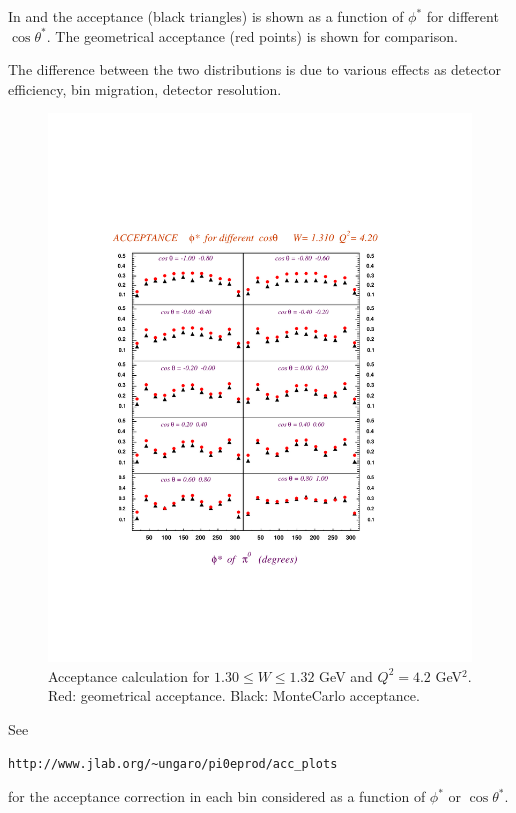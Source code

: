 In  and  the acceptance (black triangles)
is shown as a function of $\phi^*$ for different $\cos\theta^*$. 
The geometrical acceptance (red points)
is shown for comparison.

The difference between the two distributions is due to various effects
as detector efficiency, bin migration, detector resolution.




\begin{figure}[h]
 \begin{center}
  \includegraphics[width=15cm, bb=0 120 540 640]{acceptance/img/acc_phi_W1.31_Q24.20}
  \caption[Comparison Geometrical and MonteCarlo acceptances, $1.30\le W\le 1.32$ GeV and $Q^2=4.2$ GeV$^2$]
          { Acceptance calculation for $1.30\le W\le 1.32$ GeV and $Q^2=4.2$ GeV$^2$. Red: geometrical 
	             acceptance. Black: MonteCarlo acceptance.}
 \label{fig:accept2}
  \end{center} 
\end{figure} 

See    \begin{verbatim} 
http://www.jlab.org/~ungaro/pi0eprod/acc_plots
\end{verbatim}
for the acceptance correction in each bin considered as a function of $\phi^*$ or $\cos\theta^*$.














